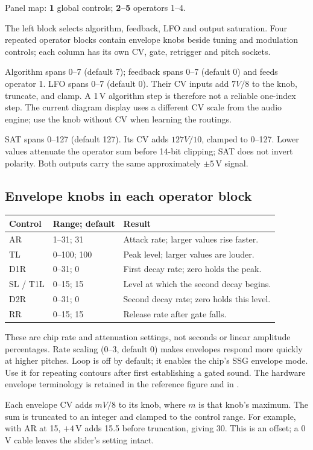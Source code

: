 Panel map: \textbf{1} global controls;
\textbf{2--5} operators 1--4.

The left block selects algorithm, feedback, LFO and output saturation. Four
repeated operator blocks contain envelope knobs beside tuning and modulation
controls; each column has its own CV, gate, retrigger and pitch sockets.

Algorithm spans 0--7 (default 7); feedback spans 0--7 (default 0) and feeds
operator 1. LFO spans 0--7 (default 0). Their CV inputs add $7V/8$ to the
knob, truncate, and clamp. A 1\,V algorithm step is therefore not a reliable
one-index step. The current diagram display uses a different CV scale from
the audio engine; use the knob without CV when learning the routings.

SAT spans 0--127 (default 127). Its CV adds $127V/10$, clamped to 0--127.
Lower values attenuate the operator sum before 14-bit clipping; SAT does not
invert polarity. Both outputs carry the same approximately $\pm5$\,V signal.

\subsection{Envelope knobs in each operator block}
\begin{tabularx}{\textwidth}{@{}l l X@{}}
\toprule Control & Range; default & Result \\\midrule
AR & 1--31; 31 & Attack rate; larger values rise faster. \\
TL & 0--100; 100 & Peak level; larger values are louder. \\
D1R & 0--31; 0 & First decay rate; zero holds the peak. \\
SL / T1L & 0--15; 15 & Level at which the second decay begins. \\
D2R & 0--31; 0 & Second decay rate; zero holds this level. \\
RR & 0--15; 15 & Release rate after gate falls. \\
\bottomrule
\end{tabularx}

These are chip rate and attenuation settings, not seconds or linear amplitude
percentages. Rate scaling (0--3, default 0) makes envelopes respond more quickly
at higher pitches. Loop is off by default; it enables the chip's SSG envelope
mode. Use it for repeating contours after first establishing a gated sound.
The hardware envelope terminology is retained in the reference figure and
in \citet{genesis-sound-software-manual}.

Each envelope CV adds $mV/8$ to its knob, where $m$ is that knob's maximum.
The sum is truncated to an integer and clamped to the control range. For
example, with AR at 15, $+4$\,V adds 15.5 before truncation, giving 30.
This is an offset; a 0\,V cable leaves the slider's setting intact.
